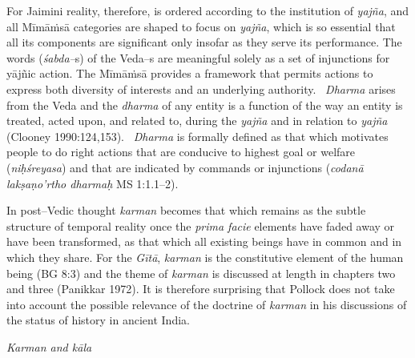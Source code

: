 For Jaimini reality, therefore, is ordered according to the institution of \textit{yajña}, and all Mīmāṁsā categories are shaped to focus on \textit{yajña}, which is so essential that all its components are significant only insofar as they serve its performance. The words (\textit{śabda–}s) of the Veda–s are meaningful solely as a set of injunctions for yājñic action. The Mīmāṁsā provides a framework that permits actions to express both diversity of interests and an underlying authority.  \textit{Dharma} arises from the Veda and the \textit{dharma} of any entity is a function of the way an entity is treated, acted upon, and related to, during the \textit{yajña} and in relation to \textit{yajña} (Clooney 1990:124,153).  \textit{Dharma} is formally defined as that which motivates people to do right actions that are conducive to highest goal or welfare (\textit{niḥśreyasa}) and that are indicated by commands or injunctions (\textit{codanā lakṣaṇo'rtho dharmaḥ} MS 1:1.1–2).

In post–Vedic thought \textit{karman} becomes that which remains as the subtle structure of temporal reality once the \textit{prima facie} elements have faded away or have been transformed, as that which all existing beings have in common and in which they share. For the \textit{Gītā}, \textit{karman} is the constitutive element of the human being (BG 8:3) and the theme of \textit{karman} is discussed at length in chapters two and three (Panikkar 1972). It is therefore surprising that Pollock does not take into account the possible relevance of the doctrine of \textit{karman} in his discussions of the status of history in ancient India.

\textit{Karman and kāla}

